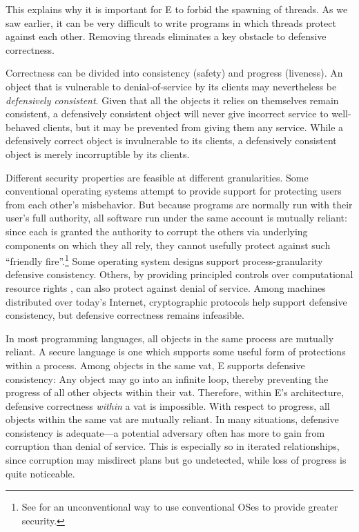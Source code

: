\documentclass{llncs}
\begin{document}
This explains why it is important for E to forbid the spawning of
threads.  As we saw earlier, it can be very difficult to write
programs in which threads protect against each other.  Removing
threads eliminates a key obstacle to defensive correctness.

Correctness can be divided into consistency (safety) and progress
(liveness). An object that is vulnerable to denial-of-service by its
clients may nevertheless be \emph{defensively consistent}. Given that
all the objects it relies on themselves remain consistent, a
defensively consistent object will never give incorrect service to
well-behaved clients, but it may be prevented from giving them any
service. While a defensively correct object is invulnerable to its
clients, a defensively consistent object is merely incorruptible by
its clients.

Different security properties are feasible at different
granularities. Some conventional operating systems attempt to provide
support for protecting users from each other's misbehavior. But
because programs are normally run with their user's full authority,
all software run under the same account is mutually reliant: since
each is granted the authority to corrupt the others via underlying
components on which they all rely, they cannot usefully protect
against such ``friendly fire''.\footnote{
%
See \cite{stiegler:polaris} for an unconventional way to use
conventional OSes to provide greater security.}
%
Some operating system designs \cite{dvh} support process-granularity
defensive consistency. Others, by providing principled controls over
computational resource rights \cite{hardy:keykos,shapiro:eros}, can
also protect against denial of service. Among machines distributed
over today's Internet, cryptographic protocols help support defensive
consistency, but defensive correctness remains infeasible.

In most programming languages, all objects in the same process are
mutually reliant. A secure language is one which supports some useful
form of protections within a process.  Among objects in the same vat,
E supports defensive consistency: Any object may go into an infinite
loop, thereby preventing the progress of all other objects within
their vat. Therefore, within E's architecture, defensive correctness
\emph{within} a vat is impossible. With respect to progress, all
objects within the same vat are mutually reliant. In many situations,
defensive consistency is adequate---a potential adversary often has
more to gain from corruption than denial of service. This is
especially so in iterated relationships, since corruption may
misdirect plans but go undetected, while loss of progress is quite
noticeable.
\end{document}
